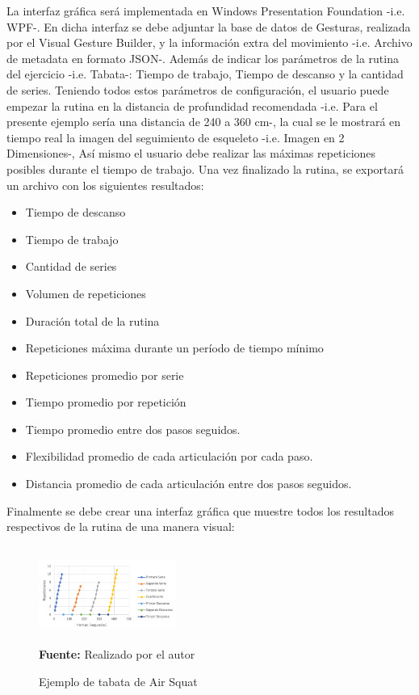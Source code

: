 \documentclass[twoside,twocolumn]{article}
\begin{document}
La interfaz gráfica será implementada en Windows Presentation Foundation -i.e. WPF-. En dicha interfaz se debe adjuntar la base de datos de Gesturas, realizada por el Visual Gesture Builder,  y la información extra del movimiento -i.e. Archivo de metadata en formato JSON-. Además de indicar  los parámetros de la rutina del ejercicio -i.e. Tabata-: Tiempo de trabajo, Tiempo de descanso y la cantidad de series.
\medbreak 
Teniendo todos estos parámetros de configuración, el usuario puede empezar la rutina en la distancia de profundidad recomendada -i.e. Para el presente ejemplo sería una distancia de 240 a 360 cm-, la cual se le mostrará en tiempo real la imagen del seguimiento de esqueleto  -i.e. Imagen en 2 Dimensiones-, Así mismo el usuario debe realizar las máximas repeticiones posibles durante el tiempo de trabajo. Una vez finalizado la rutina, se exportará un archivo con los siguientes resultados:
\begin{itemize}
\item Tiempo de descanso
\item Tiempo de trabajo
\item Cantidad de series
\item Volumen de repeticiones
\item Duración total de la rutina
\item Repeticiones máxima durante un período de tiempo mínimo
\item Repeticiones promedio por serie
\item Tiempo promedio por repetición
\item Tiempo promedio entre dos pasos seguidos.
\item Flexibilidad promedio de cada articulación por cada paso.
\item Distancia promedio de cada articulación entre dos pasos seguidos.
\end{itemize}
Finalmente se debe crear una interfaz gráfica que muestre todos los resultados respectivos de la rutina de una manera visual:
\begin{figure}[H]
	\caption{Ejemplo de tabata de Air Squat}
	\label{fig:hiit}
	\centering
	\includegraphics[width=170px,height=120px]{img/hiitMf.PNG} \\
	\textbf{Fuente:} Realizado por el autor
\end{figure}
\end{document}
